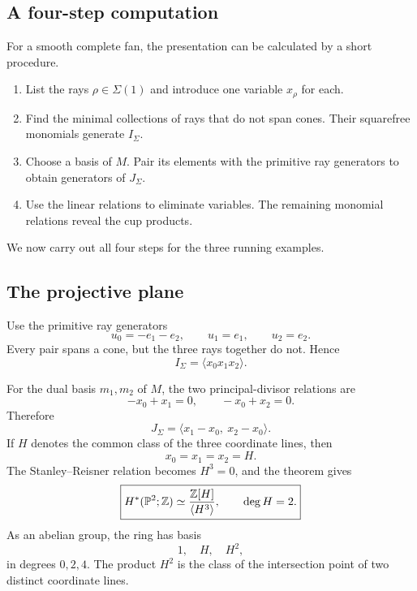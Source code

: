 \subsection{A four-step computation}

For a smooth complete fan, the presentation can be calculated by a
short procedure.

\begin{enumerate}[label=\textbf{Step \arabic*.},wide=0pt]
\item List the rays \(\rho\in\Sigma(1)\) and introduce one variable
\(x_\rho\) for each.

\item Find the minimal collections of rays that do not span cones.
Their squarefree monomials generate \(I_\Sigma\).

\item Choose a basis of \(M\). Pair its elements with the primitive
ray generators to obtain generators of \(J_\Sigma\).

\item Use the linear relations to eliminate variables. The remaining
monomial relations reveal the cup products.
\end{enumerate}

We now carry out all four steps for the three running examples.

\subsection{The projective plane}

\begin{example}
\label{ex:cohomology-ring-projective-plane}
Use the primitive ray generators
\[
u_0=-e_1-e_2,
\qquad
u_1=e_1,
\qquad
u_2=e_2.
\]
Every pair spans a cone, but the three rays together do not. Hence
\[
I_\Sigma=\langle x_0x_1x_2\rangle.
\]

For the dual basis \(m_1,m_2\) of \(M\), the two principal-divisor
relations are
\[
-x_0+x_1=0,
\qquad
-x_0+x_2=0.
\]
Therefore
\[
J_\Sigma
=
\langle x_1-x_0,\ x_2-x_0\rangle.
\]
If \(H\) denotes the common class of the three coordinate lines, then
\[
x_0=x_1=x_2=H.
\]
The Stanley--Reisner relation becomes \(H^3=0\), and the theorem gives
\[
\boxed{
H^*(\mathbb{P}^2;\mathbb{Z})
\simeq
\frac{\mathbb{Z}[H]}{\langle H^3\rangle},
\qquad
\deg H=2.
}
\]
As an abelian group, the ring has basis
\[
1,\quad H,\quad H^2,
\]
in degrees \(0,2,4\). The product \(H^2\) is the class of the
intersection point of two distinct coordinate lines.
\end{example}

